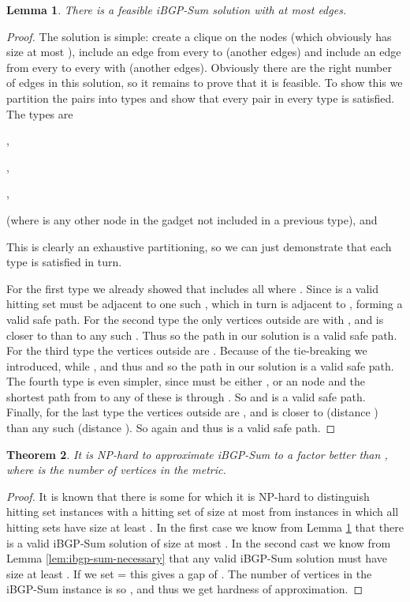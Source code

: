 \documentclass[11pt,letterpaper]{article}
\newtheorem{theorem}{Theorem}[section]
\newtheorem{lemma}[theorem]{Lemma}
\theoremstyle{definition}
\begin{document}
\begin{lemma} \label{lem:ibgp-sum-sufficient}
  There is a feasible {\sc iBGP-Sum} solution with at most  edges.
\end{lemma}
\begin{proof}
  The solution is simple: create a clique on the 
  nodes (which obviously has size at most ), include an
  edge from every  to  (another  edges) and include an
  edge from every  to every  with  (another  edges).  Obviously there are the right number of edges in this
  solution, so it remains to prove that it is feasible.  To show this
  we partition the pairs into types and show that every pair in every
  type is satisfied.  The types are
  \begin{inparaenum}[\itshape 1\upshape)]
  \item ,
  \item ,
  \item ,
  \item  (where  is any other node in the gadget
    not included in a previous type), and
  \item 
  \end{inparaenum}
  This is clearly an exhaustive partitioning, so we can just
  demonstrate that each type is satisfied in turn.

  For the first type we already showed that  includes
  all  where .  Since  is a valid hitting set 
  must be adjacent to one such , which in turn is adjacent to
  , forming a valid safe path.  For the second type the only
  vertices outside  are  with , and
   is closer to  than to any such .  Thus 
  so the path  in our solution is a valid safe path.  For
  the third type the vertices outside  are .  Because of the tie-breaking we
  introduced,  while , and thus  and so the
  path  in our solution is a valid safe path.  The
  fourth type is even simpler, since  must be either ,
  or an  node and the shortest path from  to any of these is
  through .  So  and  is a
  valid safe path.  Finally, for the last type the vertices outside
   are , and  is closer
  to  (distance ) than any such  (distance
  ).  So again  and thus  is a valid safe path.
\end{proof}


\begin{theorem}
\label{thm:iBGP_sumhard}
  It is NP-hard to approximate {\sc iBGP-Sum} to a factor better than
  , where  is the number of vertices in the
  metric.
\end{theorem}
\begin{proof}
  It is known that there is some  for which it is NP-hard to
  distinguish hitting set instances with a hitting set of size at most
   from instances in which all hitting sets have size at least
  .  In the first case we know from Lemma
  \ref{lem:ibgp-sum-sufficient} that there is a valid {\sc iBGP-Sum}
  solution of size at most .  In the
  second cast we know from Lemma \ref{lem:ibgp-sum-necessary} that any
  valid {\sc iBGP-Sum} solution must have size at least .  If we set  =  this gives a gap of .  The number of vertices  in the {\sc iBGP-Sum}
  instance is  so , and thus we
  get  hardness of approximation.
\end{proof}
\end{document}
